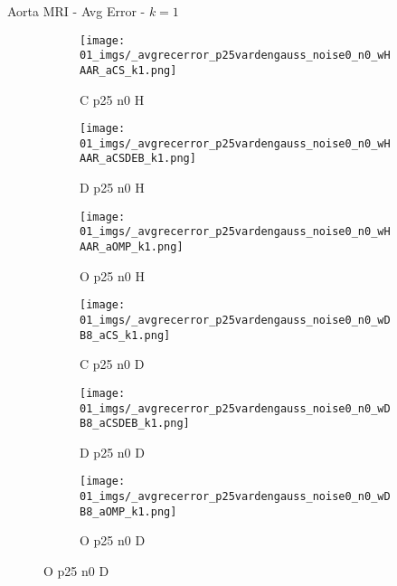 \begin{frame}{Aorta MRI - Avg Error - $k=1$}{}
\begin{figure}
\begin{subfigure}{0.13\textwidth}
\texttt{[image: 01\_imgs/\_avgrecerror\_p25vardengauss\_noise0\_n0\_wHAAR\_aCS\_k1.png]}
\caption*{\tiny C p25 n0 H}
\end{subfigure}
\begin{subfigure}{0.13\textwidth}
\texttt{[image: 01\_imgs/\_avgrecerror\_p25vardengauss\_noise0\_n0\_wHAAR\_aCSDEB\_k1.png]}
\caption*{\tiny D p25 n0 H}
\end{subfigure}
\begin{subfigure}{0.13\textwidth}
\texttt{[image: 01\_imgs/\_avgrecerror\_p25vardengauss\_noise0\_n0\_wHAAR\_aOMP\_k1.png]}
\caption*{\tiny O p25 n0 H}
\end{subfigure}
\begin{subfigure}{0.13\textwidth}
\texttt{[image: 01\_imgs/\_avgrecerror\_p25vardengauss\_noise0\_n0\_wDB8\_aCS\_k1.png]}
\caption*{\tiny C p25 n0 D}
\end{subfigure}
\begin{subfigure}{0.13\textwidth}
\texttt{[image: 01\_imgs/\_avgrecerror\_p25vardengauss\_noise0\_n0\_wDB8\_aCSDEB\_k1.png]}
\caption*{\tiny D p25 n0 D}
\end{subfigure}
\begin{subfigure}{0.13\textwidth}
\texttt{[image: 01\_imgs/\_avgrecerror\_p25vardengauss\_noise0\_n0\_wDB8\_aOMP\_k1.png]}
\caption*{\tiny O p25 n0 D}
\end{subfigure}

\vspace{5pt}


\end{figure}
\end{frame}
